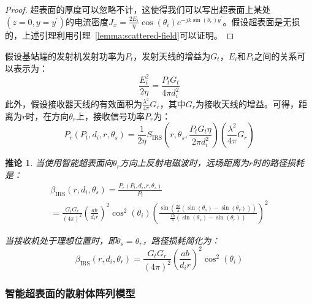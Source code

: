 \documentclass[supercite]{HustGraduPaper}
\newtheorem{corollary}{\indent 推论}[section]
\begin{document}
\begin{proof}
	超表面的厚度可以忽略不计，这使得我们可以写出超表面上某处$(z=0, y=y^\prime)$的电流密度$J_{x}=\frac{2 E_{i}}{\eta} \cos \left(\theta_{i}\right) e^{-j k \sin \left(\theta_{r}\right) y^{\prime}}$。假设超表面是无损的，上述引理利用引理~\ref{lemma:scattered-field}可以证明。
\end{proof}

假设基站端的发射机发射功率为$P_t$，发射天线的增益为$G_t$，$E_i$和$P_t$之间的关系可以表示为：
\begin{equation}
	\frac{E_{i}^{2}}{2 \eta}=\frac{P_{t} G_{t}}{4 \pi d_{i}^{2}}
\end{equation}
此外，假设接收器天线的有效面积为$\frac{\lambda^2}{4\pi} G_r$，其中$G_r$为接收天线的增益。可得，距离为$r$时，在方向$\theta_r$上，接收信号功率$P_r$为：
\begin{equation}
	P_{r}\left(P_{t}, d_{i}, r, \theta_{s}\right)=\frac{1}{2 \eta} S_{\mathrm{IRS}}\left(r, \theta_{s}, \frac{P_{t} G_{t} \eta}{2 \pi d_{i}^{2}}\right)\left(\frac{\lambda^{2}}{4 \pi} G_{r}\right)
\end{equation}

\begin{corollary}
	当使用智能超表面向$\theta_r$方向上反射电磁波时，远场距离为$r$时的路径损耗是：
	\begin{equation}
		\begin{array}{l}
			\beta_{\mathrm{IRS}}\left(r, d_{i}, \theta_{s}\right)=\frac{P_{r}\left(P_{t}, d_{i}, r, \theta_{s}\right)}{P_{t}} \\
			=\frac{G_{t} G_{r}}{(4 \pi)^{2}}\left(\frac{a b}{d_{i} r}\right)^{2} \cos ^{2}\left(\theta_{i}\right)\left(\frac{\sin \left(\frac{\pi b}{\lambda}\left(\sin \left(\theta_{s}\right)-\sin \left(\theta_{r}\right)\right)\right)}{\frac{\pi b}{\lambda}\left(\sin \left(\theta_{s}\right)-\sin \left(\theta_{r}\right)\right)}\right)^{2}
		\end{array}
	\end{equation}

	当接收机处于理想位置时，即$\theta_s=\theta_r$，路径损耗简化为：
	\begin{equation}
		\beta_{\mathrm{IRS}}\left(r, d_{i}, \theta_{r}\right)=\frac{G_{t} G_{r}}{(4 \pi)^{2}}\left(\frac{a b}{d_{i} r}\right)^{2} \cos ^{2}\left(\theta_{i}\right)
	\end{equation}
\end{corollary}

\subsubsection{智能超表面的散射体阵列模型}
\end{document}
